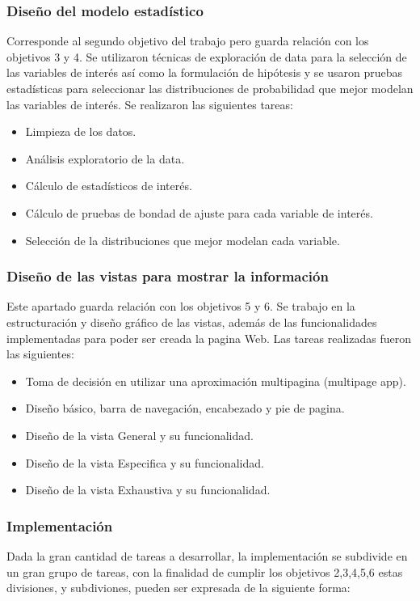 \subsubsection{Diseño del modelo estadístico}
Corresponde al segundo objetivo del trabajo pero guarda relación con los
objetivos 3 y 4. Se utilizaron técnicas de exploración de data para la
selección de las variables de interés así como la formulación de hipótesis y se
usaron pruebas estadísticas para seleccionar las distribuciones de probabilidad
que mejor modelan las variables de interés. Se realizaron las siguientes
tareas:

\begin{itemize}
    \item Limpieza de los datos.
    \item Análisis exploratorio de la data.
    \item Cálculo de estadísticos de interés.
    \item Cálculo de pruebas de bondad de ajuste para cada variable de interés.
    \item Selección de la distribuciones que mejor modelan cada variable.
\end{itemize}

\subsubsection{Diseño de las vistas para mostrar la información}
Este apartado guarda relación con los objetivos 5 y 6. Se trabajo en la
estructuración y diseño gráfico de las vistas, además de las funcionalidades
implementadas para poder ser creada la pagina Web. Las tareas realizadas
fueron las siguientes:

\begin{itemize}
    \item Toma de decisión en utilizar una aproximación multipagina (multipage app).
    \item Diseño básico, barra de navegación, encabezado y pie de pagina.
    \item Diseño de la vista General y su funcionalidad.
    \item Diseño de la vista Especifica y su funcionalidad.
    \item Diseño de la vista Exhaustiva y su funcionalidad.
\end{itemize}

\subsubsection{Implementación}
Dada la gran cantidad de tareas a desarrollar, la implementación se subdivide
en un gran grupo de tareas, con la finalidad de cumplir los objetivos 2,3,4,5,6
estas divisiones, y subdiviones, pueden ser expresada de la siguiente forma:

